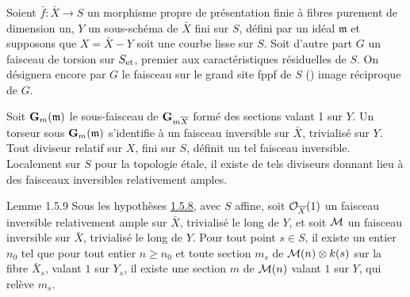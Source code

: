 \documentclass[10pt]{../fichiers-configuration-latex/smfart}
\begin{document}
\setcounter{subsubsection}{7}
\subsubsection{}
Soient $\bar{f}:\bar{X}\rightarrow S$ un morphisme propre de
présentation finie à fibres purement de dimension un, $Y$ un
sous-schéma de $\bar{X}$ fini sur $S$, défini par un idéal $\mathfrak{m}$ et
supposons que $X=\bar{X}-Y$ soit une courbe lisse sur $S$. Soit
d'autre part $G$ un faisceau de torsion sur $S_{\text{\rm et}}$,
premier aux caractéristiques résiduelles de $S$. On désignera encore
par $G$ le faisceau sur le grand site fppf de $S$ () image
réciproque de $G$.

Soit $\mathbf{G}_{m}(\mathfrak{m})$ le sous-faisceau de $\mathbf{G}_{m\overline{X}}$
formé des sections valant 1 sur $Y$. Un torseur sous
$\mathbf{G}_{m}(\mathfrak{m})$ s'identifie à un faisceau inversible sur $\bar{X}$,
trivialisé sur $Y$. Tout diviseur relatif sur $X$, fini sur $S$,
définit un tel faisceau inversible. Localement sur $S$ pour la
topologie étale, il existe de tels diviseurs donnant lieu à des
faisceaux inversibles relativement amples.

\begin{enonce*}{Lemme 1.5.9}
Sous les hypothèses \hyperref[XVIII.subsubsec1.5.8]{1.5.8}, avec $S$ affine,
soit ${\mathcal O}_{\overline{X}}(1)$ un faisceau inversible relativement ample sur
$\bar{X}$, trivialisé le long de $Y$, et soit ${\mathcal M}$ un
faisceau inversible sur $\bar{X}$, trivialisé le long de $Y$. Pour
tout point $s\in S$, il existe un entier $n_{0}$ tel que pour tout
entier $n\geq n_{0}$ et toute section $m_{s}$ de
${\mathcal M}(n)\otimes k(s)$ sur la fibre $\bar{X}_{s}$, valant $1$
sur $Y_{s}$, il existe une section $m$ de ${\mathcal M}(n)$ valant $1$
sur $Y$, qui relève $m_{s}$.
\end{enonce*}
\end{document}
